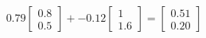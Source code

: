 \documentclass[preview]{standalone}
\begin{document}
\begin{align*}
0.79 \begin{bmatrix} 0.8 \\ 0.5 \end{bmatrix} + -0.12 \begin{bmatrix} 1 \\ 1.6 \end{bmatrix} = \begin{bmatrix} 0.51 \\ 0.20 \end{bmatrix}
\end{align*}
\end{document}
